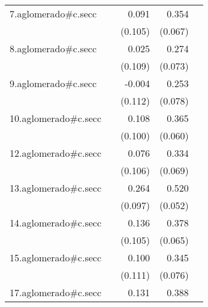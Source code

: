 {\begin{longtable}{l*{4}{D{.}{.}{-1}}}
\addlinespace
7.aglomerado#c.secc&                     &       0.091         &       0.354\sym{***}&                     \\
            &                     &     (0.105)         &     (0.067)         &                     \\
\addlinespace
8.aglomerado#c.secc&                     &       0.025         &       0.274\sym{***}&                     \\
            &                     &     (0.109)         &     (0.073)         &                     \\
\addlinespace
9.aglomerado#c.secc&                     &      -0.004         &       0.253\sym{**} &                     \\
            &                     &     (0.112)         &     (0.078)         &                     \\
\addlinespace
10.aglomerado#c.secc&                     &       0.108         &       0.365\sym{***}&                     \\
            &                     &     (0.100)         &     (0.060)         &                     \\
\addlinespace
12.aglomerado#c.secc&                     &       0.076         &       0.334\sym{***}&                     \\
            &                     &     (0.106)         &     (0.069)         &                     \\
\addlinespace
13.aglomerado#c.secc&                     &       0.264\sym{**} &       0.520\sym{***}&                     \\
            &                     &     (0.097)         &     (0.052)         &                     \\
\addlinespace
14.aglomerado#c.secc&                     &       0.136         &       0.378\sym{***}&                     \\
            &                     &     (0.105)         &     (0.065)         &                     \\
\addlinespace
15.aglomerado#c.secc&                     &       0.100         &       0.345\sym{***}&                     \\
            &                     &     (0.111)         &     (0.076)         &                     \\
\addlinespace
17.aglomerado#c.secc&                     &       0.131         &       0.388\sym{***}&                     \\

\end{longtable}}
